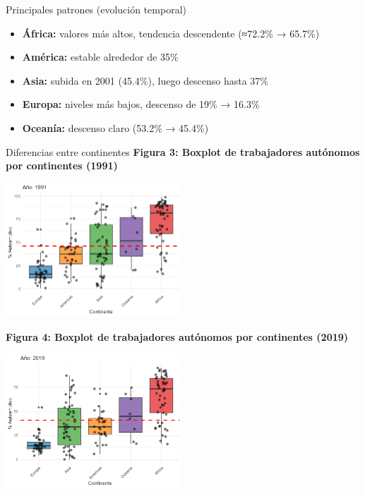 \documentclass[
  ignorenonframetext,
]{beamer}
\providecommand{\tightlist}{%
  \setlength{\itemsep}{0pt}\setlength{\parskip}{0pt}}
\begin{document}
\begin{frame}{Principales patrones (evolución temporal)}
\label{principales-patrones-evoluciuxf3n-temporal}
\begin{itemize}
\tightlist
\item
  \textbf{África:} valores más altos, tendencia descendente (≈72.2\% →
  65.7\%)\\
\item
  \textbf{América:} estable alrededor de 35\%\\
\item
  \textbf{Asia:} subida en 2001 (45.4\%), luego descenso hasta 37\%\\
\item
  \textbf{Europa:} niveles más bajos, descenso de 19\% → 16.3\%\\
\item
  \textbf{Oceanía:} descenso claro (53.2\% → 45.4\%)
\end{itemize}
\end{frame}

\begin{frame}{Diferencias entre continentes}
\label{diferencias-entre-continentes}
\textbf{Figura 3: Boxplot de trabajadores autónomos por continentes
(1991)}

\includegraphics[width=2.60417in,height=\textheight]{../informe/img/boxplot_continentes_1991.png}

\textbf{Figura 4: Boxplot de trabajadores autónomos por continentes
(2019)}

\includegraphics[width=2.60417in,height=\textheight]{../informe/img/boxplot_continentes_2019.png}
\end{frame}
\end{document}
